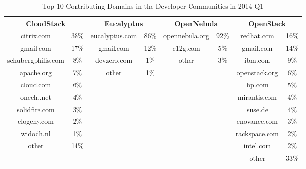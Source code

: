 \documentclass[conference]{IEEEtran}
\begin{document}
\begin{table}[t!]
\caption{Top 10 Contributing Domains in the Developer Communities in 2014 Q1}
\label{tbl:dev}
\centering
\begin{tabular}{|c|c|c|c|c|c|c|c|} \hline
    \multicolumn{2}{|c|}{CloudStack} &
    \multicolumn{2}{|c|}{Eucalyptus} &
    \multicolumn{2}{|c|}{OpenNebula} &
    \multicolumn{2}{|c|}{OpenStack} \\ \hline
citrix.com & 38\% & eucalyptus.com & 86\% & opennebula.org & 92\% & redhat.com & 16\% \\ \hline
    gmail.com & 17\% & gmail.com & 12\% & c12g.com & 5\% & gmail.com & 14\% \\ \hline
	schubergphilis.com & 8\% & devzero.com & 1\% & other & 3\% & ibm.com & 9\% \\ \hline
	apache.org & 7\% & other & 1\% & & & openstack.org & 6\% \\ \hline
	cloud.com & 6\% & & & & & hp.com & 5\% \\ \hline
	onecht.net & 4\% & & & & & mirantis.com & 4\% \\ \hline
	solidfire.com & 3\% & & & & & suse.de & 4\% \\ \hline
	clogeny.com & 2\% & & & & & enovance.com & 3\% \\ \hline
	widodh.nl & 1\% & & & & & rackspace.com & 2\% \\ \hline
	other & 14\% & & & & & intel.com & 2\% \\ \hline
	 &  & & & & & other & 33\% \\ \hline
\end{tabular}
\end{table}
\end{document}
